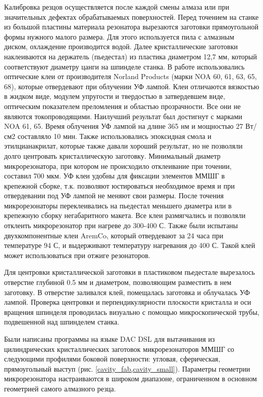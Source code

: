 Калибровка резцов осуществляется после каждой смены алмаза или при значительных дефектах обрабатываемых поверхностей.
Перед точением на станке из большой пластины материала резонатора вырезаются заготовки прямоугольной формы нужного малого размера. Для этого используется пила с алмазным диском, охлаждение производится водой.
Далее кристаллические заготовки наклеиваются на держатель (пьедестал) из пластика диаметром 12,7 мм, который соответствуют диаметру цанги на шпинделе станка. В работе использовались оптические клеи от производителя Norland Products (марки NOA 60, 61, 63, 65, 68), которые отвердевают при облучении УФ лампой. Клеи отличаются вязкостью в жидком виде, модулем упругости и твердостью в затвердевшем виде, оптическим показателем преломления и областью прозрачности. Все они не являются токопроводящими. Наилучший результат был достигнут с марками NOA 61, 65. Время облучения УФ лампой на длине 365 нм и мощностью 27 Вт/см2 составляло 10 мин. Также использовались эпоксидная смола и этилцианакрилат, которые также давали хороший результат, но не позволяли долго центровать кристаллическую заготовку. Минимальный диаметр микрорезонатора, при котором не происходило отклеивание при точении, составил 700 мкм.
УФ клеи удобны для фиксации элементов ММШГ в крепежной сборке, т.к. позволяют юстироваться необходимое время и при отвердевании под УФ лампой не меняют свои размеры. После точения микрорезонаторы переклеивались на пьедестал меньшего диаметра или в крепежную сборку негабаритного макета. Все клеи размягчались и позволяли отклеить микрорезонатор при нагреве до 300-400 С. Также были испытаны двухкомпонентные клеи AremCo, который отвердевают за 24 часа при температуре 94 С, и выдерживают температуру нагревания до 400 С. Такой клей может использоваться при отжиге резонаторов.

Для центровки кристаллической заготовки в пластиковом пьедестале вырезалось отверстие глубиной 0.5 мм и диаметром, позволяющим разместить в нем заготовку. В отверстие заливался клей, помещалась заготовка и облучалась УФ лампой. Проверка центровки и перпендикулярности плоскости кристалла и оси вращения шпинделя проводилась визуально с помощью микроскопической трубы, подвешенной над шпинделем станка.

Были написаны программы на языке DAC DSL для вытачивания из цилиндрических кристаллических заготовок микрорезонаторов ММШГ со следующими профилями боковой поверхности: угловая, сферическая, прямоугольный выступ (рис. \ref{cavity_fab,cavity_small}). Параметры геометрии микрорезонатора настраиваются в широком диапазоне, ограниченном в основном геометрией самого алмазного резца.


